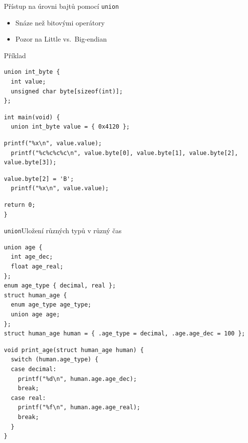 \begin{frame}[fragile]{Přístup na úrovni bajtů pomocí \texttt{union}}

  \begin{itemize}
    \item Snáze než bitovými operátory
    \item Pozor na Little vs.\ Big-endian
  \end{itemize}

  \pause

  \begin{block}{Příklad}
    \begin{lstlisting}[belowskip=0pt]
union int_byte {
  int value;
  unsigned char byte[sizeof(int)];
};
    \end{lstlisting}
    \pause
    \begin{lstlisting}[aboveskip=0pt,belowskip=3pt]
int main(void) {
  union int_byte value = { 0x4120 };
    \end{lstlisting}
    \pause
    \begin{lstlisting}[aboveskip=3pt,belowskip=3pt]
  printf("%x\n", value.value);
  printf("%c%c%c%c\n", value.byte[0], value.byte[1], value.byte[2], value.byte[3]);
    \end{lstlisting}
    \pause
    \begin{lstlisting}[aboveskip=3pt,belowskip=3pt]
  value.byte[2] = 'B';
  printf("%x\n", value.value);
    \end{lstlisting}
    \begin{lstlisting}[aboveskip=3pt]
  return 0;
}
    \end{lstlisting} %
  \end{block}

\end{frame}

\begin{frame}[fragile]{\texttt{union}}{Uložení různých typů v různý čas}

\begin{lstlisting}
union age {
  int age_dec;
  float age_real;
};
enum age_type { decimal, real };
struct human_age {
  enum age_type age_type;
  union age age;
};
struct human_age human = { .age_type = decimal, .age.age_dec = 100 };
\end{lstlisting}

\pause

\begin{lstlisting}
void print_age(struct human_age human) {
  switch (human.age_type) {
  case decimal:
    printf("%d\n", human.age.age_dec);
    break;
  case real:
    printf("%f\n", human.age.age_real);
    break;
  }
}
\end{lstlisting}

\end{frame}

